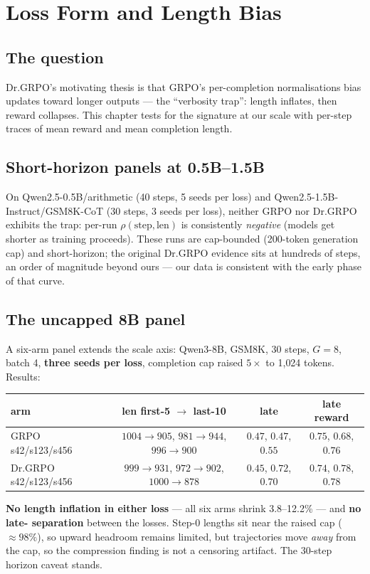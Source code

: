 \chapter{Loss Form and Length Bias}
\label{ch:lossform}

\section{The question}
Dr.GRPO's motivating thesis is that GRPO's per-completion normalisations bias
updates toward longer outputs --- the ``verbosity trap'': length inflates,
then reward collapses. This chapter tests for the signature at our scale with
per-step traces of mean reward and mean completion length.

\section{Short-horizon panels at 0.5B--1.5B}
On Qwen2.5-0.5B/arithmetic (40 steps, 5 seeds per loss) and
Qwen2.5-1.5B-Instruct/GSM8K-CoT (30 steps, 3 seeds per loss), neither GRPO nor
Dr.GRPO exhibits the trap: per-run $\rho(\text{step},\text{len})$ is
consistently \emph{negative} (models get shorter as training proceeds). These
runs are cap-bounded (200-token generation cap) and short-horizon; the
original Dr.GRPO evidence sits at hundreds of steps, an order of magnitude
beyond ours --- our data is consistent with the early phase of that curve.

\section{The uncapped 8B panel}
A six-arm panel extends the scale axis: Qwen3-8B, GSM8K, 30 steps, $G{=}8$,
batch 4, \textbf{three seeds per loss}, completion cap raised $5\times$ to
1{,}024 tokens. Results:
\begin{center}
\begin{tabular}{@{}lccc@{}}
\toprule
arm & len first-5 $\to$ last-10 & late \ZVF{} & late reward\\
\midrule
GRPO s42/s123/s456 & $1004{\to}905$, $981{\to}944$, $996{\to}900$ &
$0.47$, $0.47$, $0.55$ & $0.75$, $0.68$, $0.76$\\
Dr.GRPO s42/s123/s456 & $999{\to}931$, $972{\to}902$, $1000{\to}878$ &
$0.45$, $0.72$, $0.70$ & $0.74$, $0.78$, $0.78$\\
\bottomrule
\end{tabular}
\end{center}
\textbf{No length inflation in either loss} --- all six arms shrink 3.8--12.2\%
--- and \textbf{no late-\ZVF{} separation} between the losses. Step-0 lengths
sit near the raised cap ($\approx98\%$), so upward headroom remains limited,
but trajectories move \emph{away} from the cap, so the compression finding is
not a censoring artifact. The 30-step horizon caveat stands.

